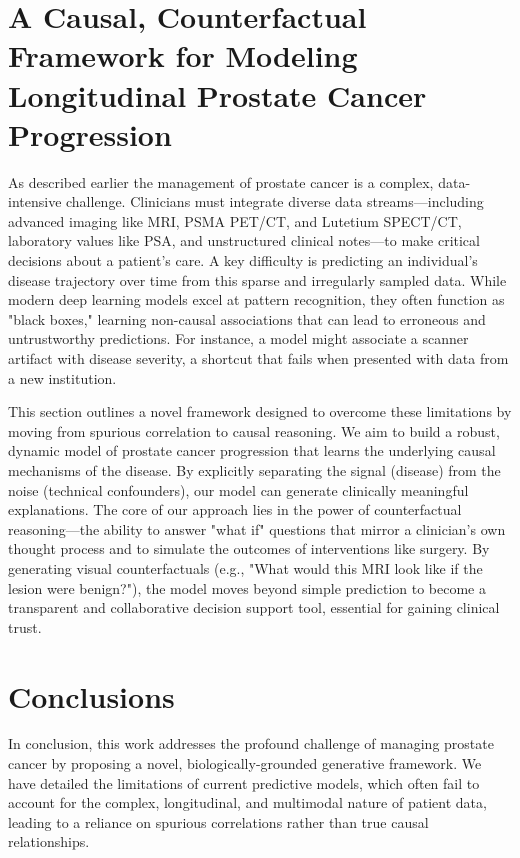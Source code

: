\documentclass[11pt, a4paper]{article}
\begin{document}
\section{A Causal, Counterfactual Framework for Modeling Longitudinal Prostate Cancer Progression}


As described earlier the management of prostate cancer is a complex, data-intensive challenge. Clinicians must integrate diverse data streams—including advanced imaging like MRI, PSMA PET/CT, and Lutetium SPECT/CT, laboratory values like PSA, and unstructured clinical notes—to make critical decisions about a patient's care. A key difficulty is predicting an individual's disease trajectory over time from this sparse and irregularly sampled data. While modern deep learning models excel at pattern recognition, they often function as "black boxes," learning non-causal associations that can lead to erroneous and untrustworthy predictions. For instance, a model might associate a scanner artifact with disease severity, a shortcut that fails when presented with data from a new institution.

This section  outlines a novel framework designed to overcome these limitations by moving from spurious correlation to causal reasoning. We aim to build a robust, dynamic model of prostate cancer progression that learns the underlying causal mechanisms of the disease. By explicitly separating the signal (disease) from the noise (technical confounders), our model can generate clinically meaningful explanations. The core of our approach lies in the power of counterfactual reasoning—the ability to answer "what if" questions that mirror a clinician's own thought process and to simulate the outcomes of interventions like surgery. By generating visual counterfactuals (e.g., "What would this MRI look like if the lesion were benign?"), the model moves beyond simple prediction to become a transparent and collaborative decision support tool, essential for gaining clinical trust.







\section*{Conclusions}
In conclusion, this work addresses the profound challenge of managing prostate cancer by proposing a novel, biologically-grounded generative framework. We have detailed the limitations of current predictive models, which often fail to account for the complex, longitudinal, and multimodal nature of patient data, leading to a reliance on spurious correlations rather than true causal relationships.
\end{document}
